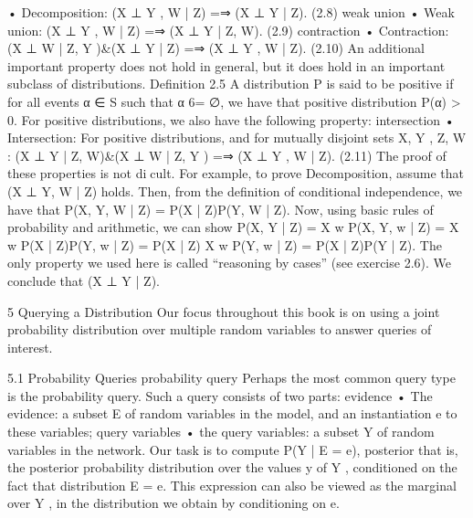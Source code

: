 • Decomposition: (X ⊥ Y , W | Z) =⇒ (X ⊥ Y | Z). (2.8) weak union • Weak union: (X ⊥ Y , W | Z) =⇒ (X ⊥ Y | Z, W). (2.9) contraction • Contraction: (X ⊥ W | Z, Y )&(X ⊥ Y | Z) =⇒ (X ⊥ Y , W | Z). (2.10) An additional important property does not hold in general, but it does hold in an important subclass of distributions. Definition 2.5 A distribution P is said to be positive if for all events α ∈ S such that α 6= ∅, we have that positive distribution P(α) > 0. For positive distributions, we also have the following property: intersection • Intersection: For positive distributions, and for mutually disjoint sets X, Y , Z, W : (X ⊥ Y | Z, W)&(X ⊥ W | Z, Y ) =⇒ (X ⊥ Y , W | Z). (2.11) The proof of these properties is not dicult. For example, to prove Decomposition, assume that (X ⊥ Y, W | Z) holds. Then, from the definition of conditional independence, we have that P(X, Y, W | Z) = P(X | Z)P(Y, W | Z). Now, using basic rules of probability and arithmetic, we can show P(X, Y | Z) = X w P(X, Y, w | Z) = X w P(X | Z)P(Y, w | Z) = P(X | Z) X w P(Y, w | Z) = P(X | Z)P(Y | Z). The only property we used here is called “reasoning by cases” (see exercise 2.6). We conclude that (X ⊥ Y | Z).

5 Querying a Distribution
Our focus throughout this book is on using a joint probability distribution over multiple random variables to answer queries of interest.

5.1 Probability Queries
probability query Perhaps the most common query type is the probability query. Such a query consists of two parts: evidence • The evidence: a subset E of random variables in the model, and an instantiation e to these variables; query variables • the query variables: a subset Y of random variables in the network. Our task is to compute P(Y | E = e), posterior that is, the posterior probability distribution over the values y of Y , conditioned on the fact that distribution E = e. This expression can also be viewed as the marginal over Y , in the distribution we obtain by conditioning on e.

